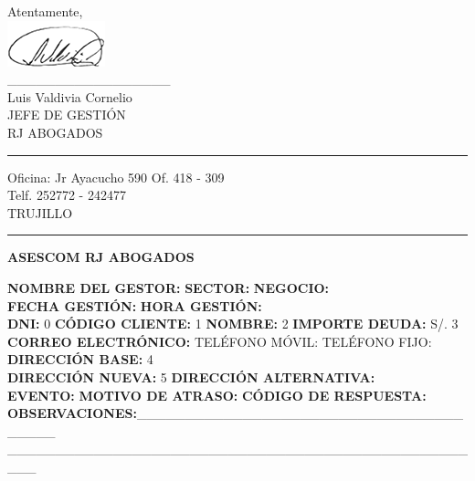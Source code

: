 \noindent Atentamente,\\
\includegraphics[natwidth=2.831041667cm, natheight=1.322916667cm]{resources/lawyer_signature.png}\\
\_\_\_\_\_\_\_\_\_\_\_\_\_\_\_\_\_\\
{\small Luis Valdivia Cornelio\\
JEFE DE GESTIÓN\\
RJ ABOGADOS}\\


\textcolor[rgb]{1.00,0.00,0.00}{\hrule}
\vspace{0.2cm}
{\noindent\footnotesize Oficina: Jr Ayacucho 590 Of. 418 - 309\\
Telf. 252772 - 242477\\
TRUJILLO}

\textcolor[rgb]{0.00,0.00,0.00}{\hrule}

\begin{center}
\textbf{\footnotesize ASESCOM RJ ABOGADOS}
\end{center}
{\noindent\footnotesize
\textbf{NOMBRE DEL GESTOR:}				\textbf{SECTOR:}		\textbf{NEGOCIO:}\\
\textbf{FECHA GESTIÓN:}		\textbf{HORA GESTIÓN:}\\
\textbf{DNI:} {0}	\textbf{CÓDIGO CLIENTE:} {1}	\textbf{NOMBRE:} {2}	\textbf{IMPORTE DEUDA:} S/. {3}\\
\textbf{CORREO ELECTRÓNICO:}				TELÉFONO MÓVIL:			TELÉFONO FIJO:\\
\textbf{DIRECCIÓN BASE:} {4}\\
\textbf{DIRECCIÓN NUEVA:} {5}	\textbf{DIRECCIÓN ALTERNATIVA:}\\
\textbf{EVENTO:}			\textbf{MOTIVO DE ATRASO:}				\textbf{CÓDIGO DE RESPUESTA:}\\
\textbf{OBSERVACIONES:}\_\_\_\_\_\_\_\_\_\_\_\_\_\_\_\_\_\_\_\_\_\_\_\_\_\_\_\_\_\_\_\_\_\_\_\_\_\_\_\\
\_\_\_\_\_\_\_\_\_\_\_\_\_\_\_\_\_\_\_\_\_\_\_\_\_\_\_\_\_\_\_\_\_\_\_\_\_\_\_\_\_\_\_\_\_\_\_\_\_\_\_
}







